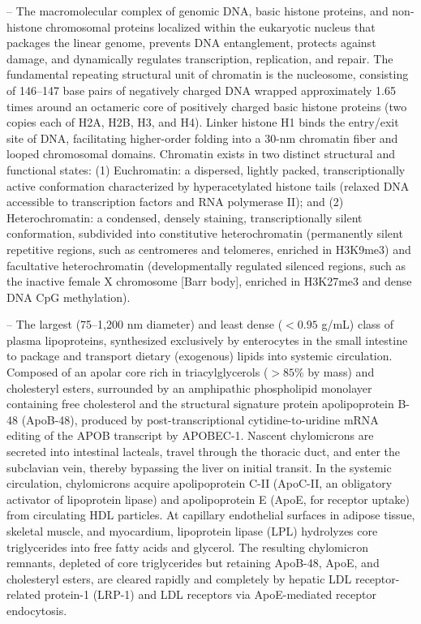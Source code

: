 -- The macromolecular complex of genomic DNA, basic histone proteins, and non-histone chromosomal proteins localized within the eukaryotic nucleus that packages the linear genome, prevents DNA entanglement, protects against damage, and dynamically regulates transcription, replication, and repair. The fundamental repeating structural unit of chromatin is the nucleosome, consisting of 146--147 base pairs of negatively charged DNA wrapped approximately 1.65 times around an octameric core of positively charged basic histone proteins (two copies each of H2A, H2B, H3, and H4). Linker histone H1 binds the entry/exit site of DNA, facilitating higher-order folding into a 30-nm chromatin fiber and looped chromosomal domains. Chromatin exists in two distinct structural and functional states: (1) Euchromatin: a dispersed, lightly packed, transcriptionally active conformation characterized by hyperacetylated histone tails (relaxed DNA accessible to transcription factors and RNA polymerase II); and (2) Heterochromatin: a condensed, densely staining, transcriptionally silent conformation, subdivided into constitutive heterochromatin (permanently silent repetitive regions, such as centromeres and telomeres, enriched in H3K9me3) and facultative heterochromatin (developmentally regulated silenced regions, such as the inactive female X chromosome [Barr body], enriched in H3K27me3 and dense DNA CpG methylation).

-- The largest (75--1,200 nm diameter) and least dense ($<0.95$ g/mL) class of plasma lipoproteins, synthesized exclusively by enterocytes in the small intestine to package and transport dietary (exogenous) lipids into systemic circulation. Composed of an apolar core rich in triacylglycerols ($>85\%$ by mass) and cholesteryl esters, surrounded by an amphipathic phospholipid monolayer containing free cholesterol and the structural signature protein apolipoprotein B-48 (ApoB-48), produced by post-transcriptional cytidine-to-uridine mRNA editing of the APOB transcript by APOBEC-1. Nascent chylomicrons are secreted into intestinal lacteals, travel through the thoracic duct, and enter the subclavian vein, thereby bypassing the liver on initial transit. In the systemic circulation, chylomicrons acquire apolipoprotein C-II (ApoC-II, an obligatory activator of lipoprotein lipase) and apolipoprotein E (ApoE, for receptor uptake) from circulating HDL particles. At capillary endothelial surfaces in adipose tissue, skeletal muscle, and myocardium, lipoprotein lipase (LPL) hydrolyzes core triglycerides into free fatty acids and glycerol. The resulting chylomicron remnants, depleted of core triglycerides but retaining ApoB-48, ApoE, and cholesteryl esters, are cleared rapidly and completely by hepatic LDL receptor-related protein-1 (LRP-1) and LDL receptors via ApoE-mediated receptor endocytosis.

